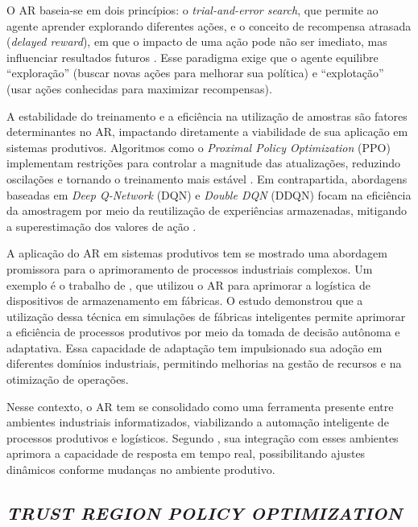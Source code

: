 \documentclass[
    12pt,                %
    openright,           %
    oneside,             %
    a4paper,             %
    english,             %
    spanish,             %
    brazil               %
]{ufscar}
\begin{document}
O AR baseia-se em dois princípios: o \textit{trial-and-error search}, que permite ao agente aprender explorando diferentes ações, e o conceito de recompensa atrasada (\textit{delayed reward}), em que o impacto de uma ação pode não ser imediato, mas influenciar resultados futuros \cite{sutton_reinforcement_2014}. Esse paradigma exige que o agente equilibre ``exploração'' (buscar novas ações para melhorar sua política) e ``explotação'' (usar ações conhecidas para maximizar recompensas).

A estabilidade do treinamento e a eficiência na utilização de amostras são fatores determinantes no AR, impactando diretamente a viabilidade de sua aplicação em sistemas produtivos. Algoritmos como o \textit{Proximal Policy Optimization} (PPO) implementam restrições para controlar a magnitude das atualizações, reduzindo oscilações e tornando o treinamento mais estável \cite{schulman_proximal_2017}. Em contrapartida, abordagens baseadas em \textit{Deep Q-Network} (DQN) e \textit{Double DQN} (DDQN) focam na eficiência da amostragem por meio da reutilização de experiências armazenadas, mitigando a superestimação dos valores de ação \cite{hasselt2015deep}. 

A aplicação do AR em sistemas produtivos tem se mostrado uma abordagem promissora para o aprimoramento de processos industriais complexos. Um exemplo é o trabalho de , que utilizou o AR para aprimorar a logística de dispositivos de armazenamento em fábricas. O estudo demonstrou que a utilização dessa técnica em simulações de fábricas inteligentes permite aprimorar a eficiência de processos produtivos por meio da tomada de decisão autônoma e adaptativa. Essa capacidade de adaptação tem impulsionado sua adoção em diferentes domínios industriais, permitindo melhorias na gestão de recursos e na otimização de operações.

Nesse contexto, o AR tem se consolidado como uma ferramenta presente entre ambientes industriais informatizados, viabilizando a automação inteligente de processos produtivos e logísticos. Segundo , sua integração com esses ambientes aprimora a capacidade de resposta em tempo real, possibilitando ajustes dinâmicos conforme mudanças no ambiente produtivo.

\subsection{\textit{TRUST REGION POLICY OPTIMIZATION}}
\end{document}
